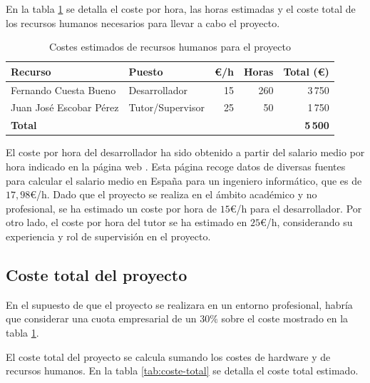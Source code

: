 En la tabla \ref{tab:recursos-humanos} se detalla el coste por hora, las horas estimadas y el coste total de los recursos humanos necesarios para llevar a cabo el proyecto.

\begin{table}[!ht]
      \centering
      \begin{tabular}{|l|l|r|r|r|}
            \hline
            \textbf{Recurso}        & \textbf{Puesto}  & \textbf{€/h} & \textbf{Horas} & \textbf{Total (€)} \\
            \hline
            Fernando Cuesta Bueno   & Desarrollador    & 15           & 260            & 3\,750             \\
            Juan José Escobar Pérez & Tutor/Supervisor & 25           & 50             & 1\,750             \\
            \hline
            \textbf{Total}          &                  &              &                & \textbf{5\,500}    \\
            \hline
      \end{tabular}
      \caption{Costes estimados de recursos humanos para el proyecto}
      \label{tab:recursos-humanos}
\end{table}

El coste por hora del desarrollador ha sido obtenido a partir del salario medio por hora indicado en la página web \cite{joobleIngenieroInformatico}. Esta página recoge datos de diversas fuentes para calcular el salario medio en España para un ingeniero informático, que es de $17,98$€/h. Dado que el proyecto se realiza en el ámbito académico y no profesional, se ha estimado un coste por hora de $15$€/h para el desarrollador. Por otro lado, el coste por hora del tutor se ha estimado en $25$€/h, considerando su experiencia y rol de supervisión en el proyecto.

\subsection{Coste total del proyecto}

En el supuesto de que el proyecto se realizara en un entorno profesional, habría que considerar una cuota empresarial de un $30\%$ sobre el coste mostrado en la tabla \ref{tab:recursos-humanos}.

El coste total del proyecto se calcula sumando los costes de hardware y de recursos humanos. En la tabla \ref{tab:coste-total} se detalla el coste total estimado.

